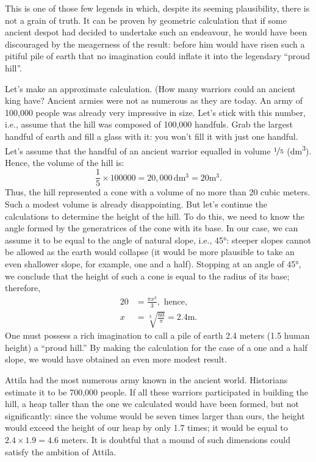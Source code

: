 This is one of those few legends in which, despite its seeming plausibility, there is not a grain of truth. It can be proven by geometric calculation that if some ancient despot had decided to undertake such an endeavour, he would have been discouraged by the meagerness of the result: before him would have risen such a pitiful pile of earth that no imagination could inflate it into the legendary ``proud hill''.

Let's make an approximate calculation. (How many warriors could an ancient king have? Ancient armies were not as numerous as they are today. An army of 100,000 people was already very impressive in size. Let's stick with this number, i.e., assume that the hill was composed of 100,000 handfuls. Grab the largest handful of earth and fill a glass with it: you won't fill it with just one handful. Let's assume that the handful of an ancient warrior equalled in volume $\nicefrac{1}{5}$ (\si{\deca\meter\cubed}). Hence, the volume of the hill is:
\begin{equation*}%
\frac{1}{5} \times 100000 = 20,000\, \si{\deca\meter\cubed} = 20 \si{\meter\cubed}.
\end{equation*}
Thus, the hill represented a cone with a volume of no more than 20 cubic meters. Such a modest volume is already disappointing. But let's continue the calculations to determine the height of the hill. To do this, we need to know the angle formed by the generatrices of the cone with its base. In our case, we can assume it to be equal to the angle of natural slope, i.e., \ang{45}: steeper slopes cannot be allowed as the earth would collapse (it would be more plausible to take an even shallower slope, for example, one and a half). Stopping at an angle of \ang{45}, we conclude that the height of such a cone is equal to the radius of its base; therefore,
\begin{align*}%
20 & = \frac{\pi x^{3}}{3}, \,\, \text{hence,}\\
x & = \sqrt[3]{\frac{60}{\pi}} =  2.4 \si{\meter}.
\end{align*}
One must possess a rich imagination to call a pile of earth 2.4 meters (1.5 human height) a ``proud hill.'' By making the calculation for the case of a one and a half slope, we would have obtained an even more modest result.

Attila had the most numerous army known in the ancient world. Historians estimate it to be 700,000 people. If all these warriors participated in building the hill, a heap taller than the one we calculated would have been formed, but not significantly: since the volume would be seven times larger than ours, the height would exceed the height of our heap by only 1.7 times; it would be equal to $2.4 \times 1.9 = 4.6$ meters. It is doubtful that a mound of such dimensions could satisfy the ambition of Attila.

